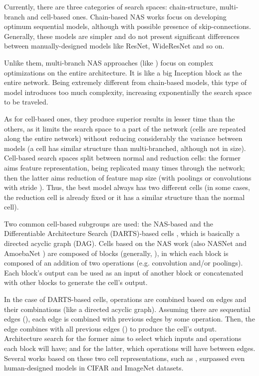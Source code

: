 \documentclass[conference]{IEEEtran}
\begin{document}
	Currently, there are three categories of search spaces: chain-structure, multi-branch  and cell-based ones.
	Chain-based NAS works focus on developing optimum sequential models, although with possible presence of skip-connections.
	Generally, these models are simpler and do not present significant differences between manually-designed models like ResNet, WideResNet and so on.
	
	Unlike them, multi-branch NAS approaches (like \cite{elsken2017simple, elsken1804efficient}) focus on complex optimizations on the entire architecture.
	It is like a big Inception \cite{szegedy2017inception} block as the entire network.
	Being extremely different from chain-based models, this type of model introduces too much complexity, increasing exponentially the search space to be traveled.
	
	As for cell-based ones, they produce superior results in lesser time than the others, as it limits the search space to a part of the network (cells are repeated along the entire network) without reducing considerably the variance between models (a cell has similar structure than multi-branched, although not in size).
	Cell-based search spaces split between normal and reduction cells: the former aims feature representation, being replicated many times through the network; then the latter aims reduction of feature map size (with poolings or convolutions with stride ).
	Thus, the best model always has two different cells (in some cases, the reduction cell is already fixed or it has a similar structure than the normal cell).
	
	Two common cell-based subgroups are used: the NAS-based \cite{elsken2017simple} and the Differentiable Architecture Search (DARTS)-based cells \cite{liu2018darts}, which is basically a directed acyclic graph (DAG).
	Cells based on the NAS work (also NASNet \cite{zoph2017learning} and AmoebaNet \cite{real2018regularized}) are composed of  blocks (generally, ), in which each block is composed of an addition of two operations (e.g. convolution and/or poolings).
	Each block's output can be used as an input of another block or concatenated with other blocks to generate the cell's output.
	
	In the case of DARTS-based cells, operations are combined based on edges and their combinations (like a directed acyclic graph).
	Assuming there are  sequential edges (), each edge is combined with previous edges by some operation.
	Then, the edge  combines with all previous edges () to produce the cell's output.
	Architecture search for the former aims to select which inputs and operations each block will have; and for the latter, which operations will have between edges.
	Several works based on these two cell representations, such as \cite{elsken2017simple, zoph2017learning, real2018regularized, liu2018darts}, surpassed even human-designed models in CIFAR and ImageNet datasets. 
	
\end{document}

